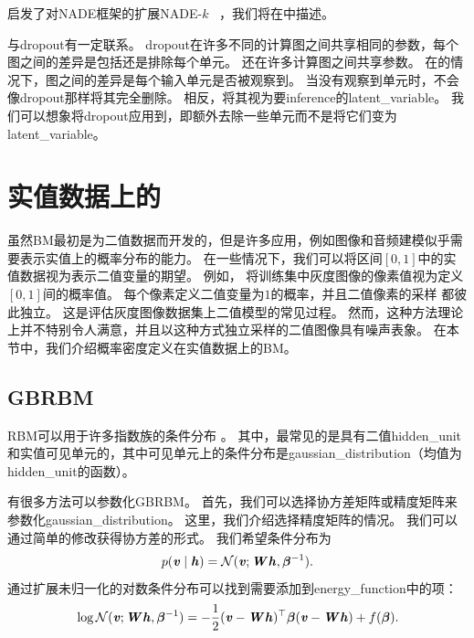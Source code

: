 启发了对NADE框架的扩展NADE-$k$~\citep{Raiko-et-al-2014} ，我们将在中描述。

与\gls{dropout}有一定联系。
\gls{dropout}在许多不同的计算图之间共享相同的参数，每个图之间的差异是包括还是排除每个单元。
还在许多计算图之间共享参数。
在的情况下，图之间的差异是每个输入单元是否被观察到。
当没有观察到单元时，不会像\gls{dropout}那样将其完全删除。
相反，将其视为要\gls{inference}的\gls{latent_variable}。
我们可以想象将\gls{dropout}应用到，即额外去除一些单元而不是将它们变为\gls{latent_variable}。


\section{实值数据上的}
\label{sec:boltzmann_machines_for_real_valued_data}
虽然\gls{BM}最初是为二值数据而开发的，但是许多应用，例如图像和音频建模似乎需要表示实值上的概率分布的能力。
在一些情况下，我们可以将区间$[0,1]$中的实值数据视为表示二值变量的期望。
例如， \citet{Hinton-PoE-2000}将训练集中灰度图像的像素值视为定义$[0,1]$间的概率值。
每个像素定义二值变量为$1$的概率，并且二值像素的采样
都彼此独立。
这是评估灰度图像数据集上二值模型的常见过程。
然而，这种方法理论上并不特别令人满意，并且以这种方式独立采样的二值图像具有噪声表象。
在本节中，我们介绍概率密度定义在实值数据上的\gls{BM}。


\subsection{\gls{GBRBM}}
\label{sec:gaussian_bernoulli_rbms}
\gls{RBM}可以用于许多指数族的条件分布 \citep{Welling05}。
其中，最常见的是具有二值\gls{hidden_unit}和实值可见单元的，其中可见单元上的条件分布是\gls{gaussian_distribution}（均值为\gls{hidden_unit}的函数）。

有很多方法可以参数化\gls{GBRBM}。
首先，我们可以选择协方差矩阵或精度矩阵来参数化\gls{gaussian_distribution}。
这里，我们介绍选择精度矩阵的情况。
我们可以通过简单的修改获得协方差的形式。
我们希望条件分布为
\begin{align}
 p(\boldsymbol{\mathit{v}}  \mid  \boldsymbol{\mathit{h}}) = \mathcal{N}(\boldsymbol{\mathit{v}}; \boldsymbol{\mathit{W}}\boldsymbol{\mathit{h}}, \boldsymbol{\beta}^{-1}).
\end{align}
通过扩展未归一化的对数条件分布可以找到需要添加到\gls{energy_function}中的项：
\begin{align} \label{eq:2039log}
 \log \mathcal{N}(\boldsymbol{\mathit{v}}; \boldsymbol{\mathit{W}}\boldsymbol{\mathit{h}}, \boldsymbol{\beta}^{-1}) = -\frac{1}{2}(\boldsymbol{\mathit{v}} - \boldsymbol{\mathit{W}}\boldsymbol{\mathit{h}})^\top \boldsymbol{\beta} (\boldsymbol{\mathit{v}} - \boldsymbol{\mathit{W}}\boldsymbol{\mathit{h}}) + 
 f(\boldsymbol{\beta}) .
\end{align}

